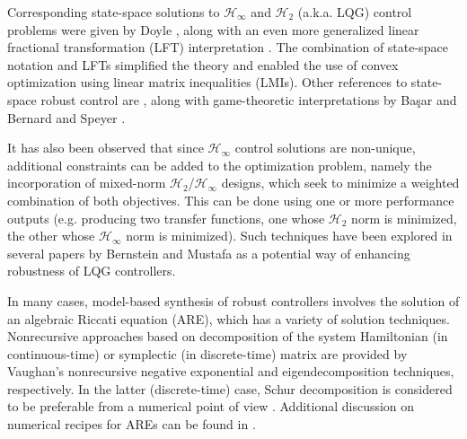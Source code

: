 Corresponding state-space solutions to $\mathcal{H}_{\infty}$ and $\mathcal{H}_{2}$ (a.k.a. LQG) control problems were given by Doyle \cite{doyle1988state}, along with an even more generalized linear fractional transformation (LFT) interpretation \cite{doyle1991review}.  The combination of state-space notation and LFTs simplified the theory and enabled the use of convex optimization using linear matrix inequalities (LMIs).  Other references to state-space robust control are \cite{limebeer1989discrete, iglesias1991state, toivonen1995lecture, deodhare1998modern}, along with game-theoretic interpretations by Ba{\c{s}}ar and Bernard \cite{basar1989dynamic, bacsar2008h, bernhard1991lecture} and Speyer \cite{rhee1991game}.

It has also been observed that since $\mathcal{H}_{\infty}$ control solutions are non-unique, additional constraints can be added to the optimization problem, namely the incorporation of mixed-norm $\mathcal{H}_{2}$/$\mathcal{H}_{\infty}$ designs, which seek to minimize a weighted combination of both objectives.  This can be done using one or more performance outputs (e.g. producing two transfer functions, one whose $\mathcal{H}_{2}$ norm is minimized, the other whose $\mathcal{H}_{\infty}$ norm is minimized).  Such techniques have been explored in several papers by Bernstein and Mustafa \cite{haddad1990generalized, haddad1991mixed, mustafa1991lqg} as a potential way of enhancing robustness of LQG controllers.
%
%
%
%
%

In many cases, model-based synthesis of robust controllers involves the solution of an algebraic Riccati equation (ARE), which has a variety of solution techniques.  Nonrecursive approaches based on decomposition of the system Hamiltonian (in continuous-time) or symplectic (in discrete-time) matrix are provided by Vaughan's nonrecursive negative exponential \cite{vaughan1969negative} and eigendecomposition \cite{vaughan1970nonrecursive} techniques, respectively.  In the latter (discrete-time) case, Schur decomposition is considered to be preferable from a numerical point of view \cite{laub1979schur}.  Additional discussion on numerical recipes for AREs can be found in \cite{pappas1980numerical, gardiner1986generalization, gudmundsson1992scaling, chen1994non, takaba1996discrete, feng2009solving, rojas2011discrete}.

